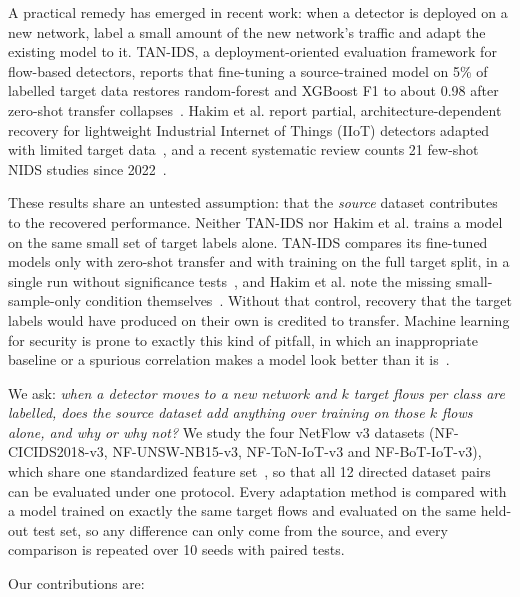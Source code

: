 \documentclass[11pt]{article}
\begin{document}
A practical remedy has emerged in recent work: when a detector is deployed on a new network, label a small amount of the new network's traffic and adapt the existing model to it. TAN-IDS, a deployment-oriented evaluation framework for flow-based detectors, reports that fine-tuning a source-trained model on 5\% of labelled target data restores random-forest and XGBoost F1 to about 0.98 after zero-shot transfer collapses~\cite{hathanh2026tanids}. Hakim et al. report partial, architecture-dependent recovery for lightweight Industrial Internet of Things (IIoT) detectors adapted with limited target data~\cite{hakim2026crossdomain}, and a recent systematic review counts 21 few-shot NIDS studies since 2022~\cite{roszeitis2026fewshot}.

These results share an untested assumption: that the \emph{source} dataset contributes to the recovered performance. Neither TAN-IDS nor Hakim et al. trains a model on the same small set of target labels alone. TAN-IDS compares its fine-tuned models only with zero-shot transfer and with training on the full target split, in a single run without significance tests~\cite{hathanh2026tanids}, and Hakim et al. note the missing small-sample-only condition themselves~\cite{hakim2026crossdomain}. Without that control, recovery that the target labels would have produced on their own is credited to transfer. Machine learning for security is prone to exactly this kind of pitfall, in which an inappropriate baseline or a spurious correlation makes a model look better than it is~\cite{arp2022dos}.

We ask: \emph{when a detector moves to a new network and $k$ target flows per class are labelled, does the source dataset add anything over training on those $k$ flows alone, and why or why not?} We study the four NetFlow v3 datasets (NF-CICIDS2018-v3, NF-UNSW-NB15-v3, NF-ToN-IoT-v3 and NF-BoT-IoT-v3), which share one standardized feature set~\cite{luay2025temporal}, so that all 12 directed dataset pairs can be evaluated under one protocol. Every adaptation method is compared with a model trained on exactly the same target flows and evaluated on the same held-out test set, so any difference can only come from the source, and every comparison is repeated over 10 seeds with paired tests.

Our contributions are:
\end{document}
